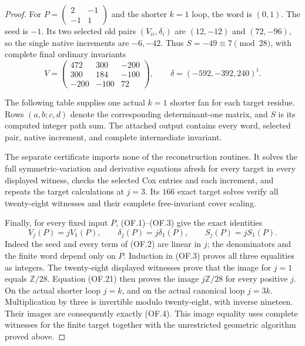 \begin{proof}
For \(P=\left(\begin{smallmatrix}2&-1\\-1&1\end{smallmatrix}\right)\)
and the shorter \(k=1\) loop, the word is \((0,1)\).
The seed is \(-1\). Its two selected old pairs
\((V_{ii},\delta_i)\) are \((12,-12)\) and \((72,-96)\),
so the single native increments are \(-6,-42\).
Thus \(S=-49\equiv7\pmod {28}\), with complete final
ordinary invariants
\[
 V=\begin{pmatrix}472&300&-200\\300&184&-100\\-200&-100&72\end{pmatrix},
 \qquad\delta=(-592,-392,240)^t.                     \tag{OF.20}
\]

The following table supplies one actual \(k=1\) shorter
fan for each target residue. Rows \((a,b;c,d)\) denote
the corresponding determinant-one matrix, and \(S\)
is its computed integer path sum. The attached output
contains every word, selected pair, native increment,
and complete intermediate invariant.


The separate certificate
imports none of the reconstruction routines. It solves
the full symmetric-variation and derivative equations
afresh for every target in every displayed witness,
checks the selected Cox entries and each increment,
and repeats the target calculations at \(j=3\).
Its \(166\) exact target solves verify all twenty-eight
witnesses and their complete free-invariant cover scaling.

Finally, for every fixed input \(P\), (OF.1)--(OF.3)
give the exact identities
\[
 V_j(P)=jV_1(P),\qquad\delta_j(P)=j\delta_1(P),\qquad
                         S_j(P)=jS_1(P).              \tag{OF.21}
\]
Indeed the seed and every term of (OF.2) are linear in
\(j\); the denominators and the finite word depend only
on \(P\). Induction in (OF.3) proves all three equalities
as integers. The twenty-eight displayed witnesses prove
that the image for \(j=1\) equals \(\mathbb Z/28\).
Equation (OF.21) then proves the image \(j\mathbb Z/28\)
for every positive \(j\). On the actual shorter loop
\(j=k\), and on the actual canonical loop \(j=3k\).
Multiplication by three is invertible modulo twenty-eight,
with inverse nineteen. Their images are consequently
exactly (OF.4). This image equality uses complete witnesses
for the finite target together with the unrestricted
geometric algorithm proved above.


\end{proof}
